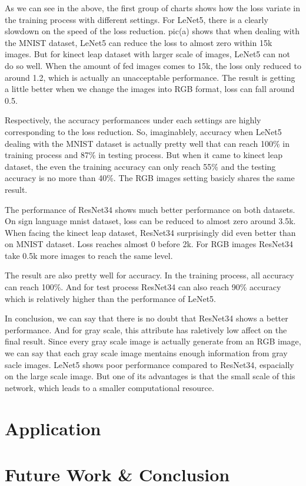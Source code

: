 \documentclass[12pt]{article}
\begin{document}
As we can see in the above, the first group of charts shows how the loss variate in the training process with different settings. For LeNet5, there is a clearly slowdown on the speed of the loss reduction. pic(a) shows that when dealing with the MNIST dataset, LeNet5 can reduce the loss to almost zero within 15k images. But for kinect leap dataset with larger scale of images, LeNet5 can not do so well. When the amount of fed images comes to 15k, the loss only reduced to around 1.2, which is actually an unacceptable performance. The result is getting a little better when we change the images into RGB format, loss can fall around 0.5. 

Respectively, the accuracy performances under each settings are highly corresponding to the loss reduction. So, imaginablely, accuracy when LeNet5 dealing with the MNIST dataset is actually pretty well that can reach 100\% in training process and 87\% in testing process. But when it came to kinect leap dataset, the even the training accuracy can only reach 55\% and the testing accuracy is no more than 40\%. The RGB images setting basicly shares the same result. 

The performance of ResNet34 shows much better performance on both datasets. On sign language mnist dataset, loss can be reduced to almost zero around 3.5k. When facing the kinect leap dataset, ResNet34 surprisingly did even better than on MNIST dataset. Loss reaches almost 0 before 2k. For RGB images ResNet34 take 0.5k more images to reach the same level.

The result are also pretty well for accuracy. In the training process, all accuracy can reach 100\%. And for test process ResNet34 can also reach 90\% accuracy which is relatively higher than the performance of LeNet5.

In conclusion, we can say that there is no doubt that ResNet34 shows a better performance. And for gray scale, this attribute has raletively low affect on the final result. Since every gray scale image is actually generate from an RGB image, we can say that each gray scale image mentains enough information from gray sacle images. LeNet5 shows poor performance compared to ResNet34, espacially on the large scale image. But one of its advantages is that the small scale of this network, which leads to a smaller computational resource.

\section{Application}
\section{Future Work \& Conclusion}
\end{document}
